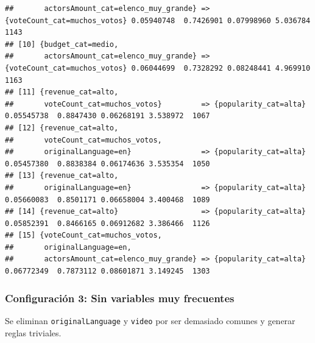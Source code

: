 \documentclass[
]{article}
\begin{document}
\begin{verbatim}
##       actorsAmount_cat=elenco_muy_grande} => {voteCount_cat=muchos_votos} 0.05940748  0.7426901 0.07998960 5.036784  1143
## [10] {budget_cat=medio,                                                                                                  
##       actorsAmount_cat=elenco_muy_grande} => {voteCount_cat=muchos_votos} 0.06044699  0.7328292 0.08248441 4.969910  1163
## [11] {revenue_cat=alto,                                                                                                  
##       voteCount_cat=muchos_votos}         => {popularity_cat=alta}        0.05545738  0.8847430 0.06268191 3.538972  1067
## [12] {revenue_cat=alto,                                                                                                  
##       voteCount_cat=muchos_votos,                                                                                        
##       originalLanguage=en}                => {popularity_cat=alta}        0.05457380  0.8838384 0.06174636 3.535354  1050
## [13] {revenue_cat=alto,                                                                                                  
##       originalLanguage=en}                => {popularity_cat=alta}        0.05660083  0.8501171 0.06658004 3.400468  1089
## [14] {revenue_cat=alto}                   => {popularity_cat=alta}        0.05852391  0.8466165 0.06912682 3.386466  1126
## [15] {voteCount_cat=muchos_votos,                                                                                        
##       originalLanguage=en,                                                                                               
##       actorsAmount_cat=elenco_muy_grande} => {popularity_cat=alta}        0.06772349  0.7873112 0.08601871 3.149245  1303
\end{verbatim}

\subsubsection{Configuración 3: Sin variables muy
frecuentes}\label{configuraciuxf3n-3-sin-variables-muy-frecuentes}

Se eliminan \texttt{originalLanguage} y \texttt{video} por ser demasiado
comunes y generar reglas triviales.
\end{document}
